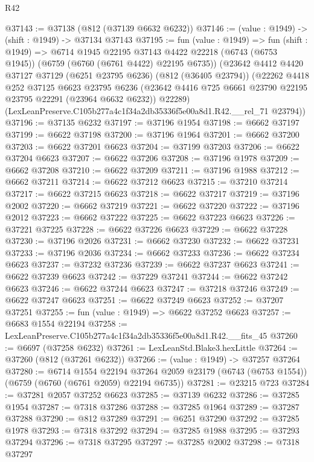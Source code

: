 \begin{lexlean}{R42}
\begin{coremodule}
{@37143 := @37138 (@812 (@37139 @6632 @6232))
@37146 := (value : @1949) -> (shift : @1949) -> @37134 @37143
@37195 := fun (value : @1949) =>
  fun (shift : @1949) =>
  @6714
    @1945
    @22195
    @37143
    @4422
    @22218
    (@6743 (@6753 @1945))
    (@6759 (@6760 (@6761 @4422) @22195 @6735))
    (@23642
      @4412
      @4420
      @37127
      @37129
      (@6251 @23795 @6236)
      (@812 (@36405 @23794))
      (@22262
        @4418
        @252
        @37125
        @6623
        @23795
        @6236
        (@23642 @4416 @725 @6661 @23790 @22195 @23795 @22291 (@23964 @6632 @6232))
        @22289)
      (LexLeanPreserve.C105b277a4c1f34a2db35336f5e00a8d1.R42.__rel_71 @23794))
@37196 := @37135 @6232
@37197 := @37196 @1954
@37198 := @6662 @37197
@37199 := @6622 @37198
@37200 := @37196 @1964
@37201 := @6662 @37200
@37203 := @6622 @37201 @6623
@37204 := @37199 @37203
@37206 := @6622 @37204 @6623
@37207 := @6622 @37206
@37208 := @37196 @1978
@37209 := @6662 @37208
@37210 := @6622 @37209
@37211 := @37196 @1988
@37212 := @6662 @37211
@37214 := @6622 @37212 @6623
@37215 := @37210 @37214
@37217 := @6622 @37215 @6623
@37218 := @6622 @37217
@37219 := @37196 @2002
@37220 := @6662 @37219
@37221 := @6622 @37220
@37222 := @37196 @2012
@37223 := @6662 @37222
@37225 := @6622 @37223 @6623
@37226 := @37221 @37225
@37228 := @6622 @37226 @6623
@37229 := @6622 @37228
@37230 := @37196 @2026
@37231 := @6662 @37230
@37232 := @6622 @37231
@37233 := @37196 @2036
@37234 := @6662 @37233
@37236 := @6622 @37234 @6623
@37237 := @37232 @37236
@37239 := @6622 @37237 @6623
@37241 := @6622 @37239 @6623
@37242 := @37229 @37241
@37244 := @6622 @37242 @6623
@37246 := @6622 @37244 @6623
@37247 := @37218 @37246
@37249 := @6622 @37247 @6623
@37251 := @6622 @37249 @6623
@37252 := @37207 @37251
@37255 := fun (value : @1949) => @6622 @37252 @6623
@37257 := @6683 @1554 @22194
@37258 := LexLeanPreserve.C105b277a4c1f34a2db35336f5e00a8d1.R42.__fits_45
@37260 := @6697 (@37258 @6232)
@37261 := LexLeanStd.Blake3.hexLittle
@37264 := @37260 (@812 (@37261 @6232))
@37266 := (value : @1949) -> @37257 @37264
@37280 := @6714
    @1554
    @22194
    @37264
    @2059
    @23179
    (@6743 (@6753 @1554))
    (@6759 (@6760 (@6761 @2059) @22194 @6735))
@37281 := @23215 @723
@37284 := @37281 @2057 @37252 @6623
@37285 := @37139 @6232
@37286 := @37285 @1954
@37287 := @7318 @37286
@37288 := @37285 @1964
@37289 := @37287 @37288
@37290 := @812 @37289
@37291 := @6251 @37290
@37292 := @37285 @1978
@37293 := @7318 @37292
@37294 := @37285 @1988
@37295 := @37293 @37294
@37296 := @7318 @37295
@37297 := @37285 @2002
@37298 := @7318 @37297
}
\end{coremodule}
\end{lexlean}

